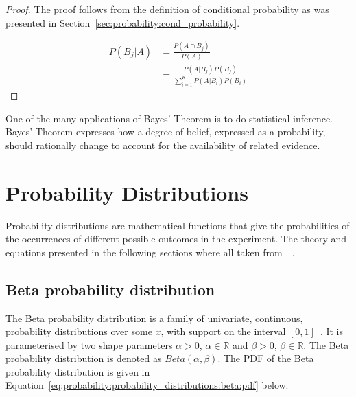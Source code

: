 \begin{proof}
      The proof follows from the definition of conditional probability as was presented in Section~\ref{sec:probability:cond_probability}.

      \begin{equation}
            \begin{split}
                  P(B_{j} \vert A)
                  &= \frac{P(A \cap B_{j})}{P(A)}\\
                  &= \frac{P(A \vert B_{j})P(B_{j})}{\sum_{i=1}^{K} P(A \vert B_{i})P(B_{i})}
            \end{split}
      \end{equation}
\end{proof}

\noindent
One of the many applications of Bayes' Theorem is to do statistical inference. Bayes' Theorem expresses how a degree of belief, expressed as a probability, should rationally change to account for the availability of related evidence.


\section{Probability Distributions}\label{sec:probability:probability_distributions}

Probability distributions are mathematical functions that give the probabilities of the occurrences of different possible outcomes in the experiment. The theory and equations presented in the following sections where all taken from~\citeauthor{ref:wackerly:2014}~\cite{ref:wackerly:2014}.


\subsection{Beta probability distribution}\label{sec:probability:probability_distributions:beta}

The Beta probability distribution is a family of univariate, continuous, probability distributions over some $x$, with support on the interval $[0,1]$~\cite{ref:wackerly:2014}. It is parameterised by two shape parameters $\alpha > 0$, $\alpha \in \mathbb{R}$ and $\beta > 0$, $\beta \in \mathbb{R}$. The Beta probability distribution is denoted as $Beta(\alpha, \beta)$. The \acf{PDF} of the Beta probability distribution is given in Equation~\eqref{eq:probability:probability_distributions:beta:pdf} below.

